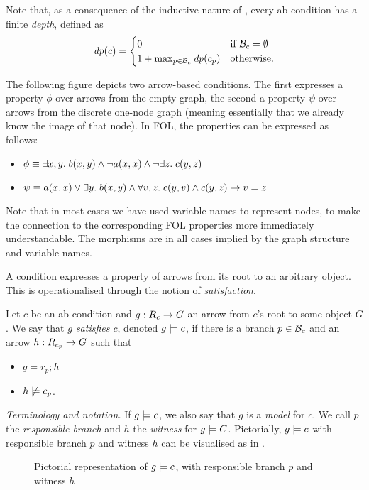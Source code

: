 Note that, as a consequence of the inductive nature of , every ab-condition has a finite \emph{depth}, defined as
\[ \mathit{dp}(c) = \begin{cases}
0 & \text{if } \mathcal{B}_c=\emptyset \\
1+\max_{p\in \mathcal{B}_c}  \mathit{dp}(c_p) & \text{otherwise.}
\end{cases}
\]

\begin{example}
The following figure depicts two arrow-based conditions. The first expresses a property $\phi$ over arrows from the empty graph, the second a property $\psi$ over arrows from the discrete one-node graph (meaning essentially that we already know the image of that node). In FOL, the properties can be expressed as follows:
\begin{itemize}
\item $\phi\equiv \exists x,y.\; b(x,y) \wedge \neg a(x,x)\wedge \neg \exists z.\; c(y,z)$
\item $\psi\equiv a(x,x)\vee \exists y.\; b(x,y) \wedge \forall v,z.\; c(y,v)\wedge c(y,z) \rightarrow v=z$
\end{itemize}
Note that in most cases we have used variable names to represent nodes, to make the connection to the corresponding FOL properties more immediately understandable. The morphisms are in all cases implied by the graph structure and variable names.
\begin{center}

\end{center}
\end{example}
%
A condition expresses a property of arrows from its root to an arbitrary object. This is operationalised through the notion of \emph{satisfaction}.

\begin{definition}
  Let $c$ be an ab-condition and $g:R_c\rightarrow G$ an arrow from $c$'s root to some object $G$. We say that \emph{$g$ satisfies $c$}, denoted $g\models c$, if there is a branch $p\in \mathcal{B}_c$ and an arrow $h:R_{c_p}\rightarrow G$ such that
  \begin{itemize}
  \item $g=r_p;h$
  \item $h\not\models c_p$.
  \end{itemize}
\end{definition}
%
\emph{Terminology and notation.} If $g\models c$, we also say that $g$ is a \emph{model} for $c$. We call $p$ the \emph{responsible branch} and $h$ the \emph{witness} for $g\models C$. Pictorially, $g\models c$ with responsible branch $p$ and witness $h$ can be visualised as in .
%
\begin{figure}
  \centering
  
  \caption{Pictorial representation of $g\models c$, with responsible branch $p$ and witness $h$}
\end{figure}

